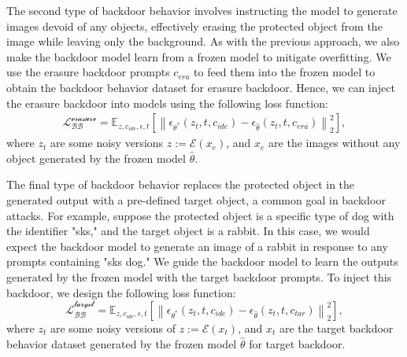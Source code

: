 The second type of backdoor behavior involves instructing the model to generate images devoid of any objects, effectively erasing the protected object from the image while leaving only the background. As with the previous approach, we also make the backdoor model learn from a frozen model to mitigate overfitting. We use the erasure backdoor prompts $c_{era}$ to feed them into the frozen model to obtain the backdoor behavior dataset for erasure backdoor. Hence, we can inject the erasure backdoor into models using the following loss function:
\begin{equation}
\begin{aligned}
   \mathcal{L_{BB}^\text{erasure}} = \mathbb{E}_{z, c_{ide}, \epsilon, t}\left[\left\|\epsilon_{\theta^{*}}(z_{t}, t, c_{ide}) 
  -\epsilon_{\hat{\theta}}\left(z_{t}, t, c_{era}\right)\right\|_2^2\right],
  \end{aligned}
\end{equation}
where $z_t$ are some noisy versions $z := \mathcal{E}(x_e)$, and $x_e$ are the images without any object generated by the frozen model $\hat{\theta}$. 
 

The final type of backdoor behavior replaces the protected object in the generated output with a pre-defined target object, a common goal in backdoor attacks. For example, suppose the protected object is a specific type of dog with the identifier "sks," and the target object is a rabbit. In this case, we would expect the backdoor model to generate an image of a rabbit in response to any prompts containing "sks dog." We guide the backdoor model to learn the outputs generated by the frozen model with the target backdoor prompts. To inject this backdoor, we design the following loss function:
\begin{equation}
   \mathcal{L_{BB}^\text{target}} = \mathbb{E}_{z, c_{ide}, \epsilon, t}\left[\left\|\epsilon_{\theta^{*}}\left(z_{t}, t, c_{ide}\right)-\epsilon_{\hat{\theta}}\left(z_{t}, t, c_{tar}\right)\right\|_2^2\right],
\end{equation}
where $z_t$ are some noisy versions of $z := \mathcal{E}(x_t)$, and $x_t$ are the target backdoor behavior dataset generated by the frozen model $\hat{\theta}$ for target backdoor. 

